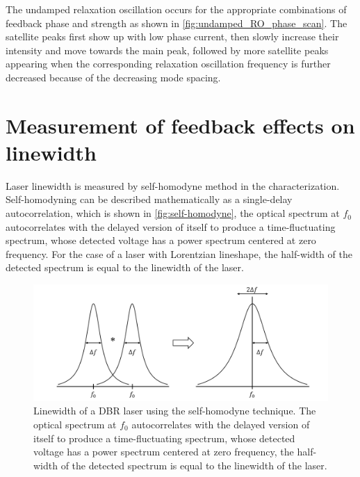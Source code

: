 The undamped relaxation oscillation occurs for the appropriate combinations of feedback phase and strength as shown in \autoref{fig:undamped_RO_phase_scan}. The satellite peaks first show up with low phase current, then slowly increase their intensity and move towards the main peak, followed by more satellite peaks appearing when the corresponding relaxation oscillation frequency is further decreased because of the decreasing mode spacing. 

\section{Measurement of feedback effects on linewidth}\label{sec:linewidth_measurement}
Laser linewidth is measured by self-homodyne method in the characterization. Self-homodyning can be described mathematically as a single-delay autocorrelation, which is shown in \autoref{fig:self-homodyne}, the optical spectrum at $f_0$ autocorrelates with the delayed version of itself to produce a time-fluctuating spectrum, whose detected voltage has a power spectrum centered at zero frequency. For the case of a laser with Lorentzian lineshape, the half-width of the detected spectrum is equal to the linewidth of the laser.
\begin{figure}[ht]
    \centering
    \includegraphics[width=.8\linewidth]{figures/self-homodyne.png}
    \caption{Linewidth of a DBR laser using the self-homodyne technique. The optical spectrum at $f_0$ autocorrelates with the delayed version of itself to produce a time-fluctuating spectrum, whose detected voltage has a power spectrum centered at zero frequency, the half-width of the detected spectrum is equal to the linewidth of the laser.}
    \label{fig:self-homodyne}
\end{figure}

